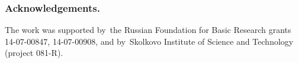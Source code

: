 \documentclass{llncs}
\begin{document}
\bigskip
\subsubsection*{Acknowledgements.}
    The work was supported by~the Russian Foundation for Basic Research grants 14-07-00847, 14-07-00908,
    and by~Skolkovo Institute of Science and Technology (project 081-R).

%


\end{document}
